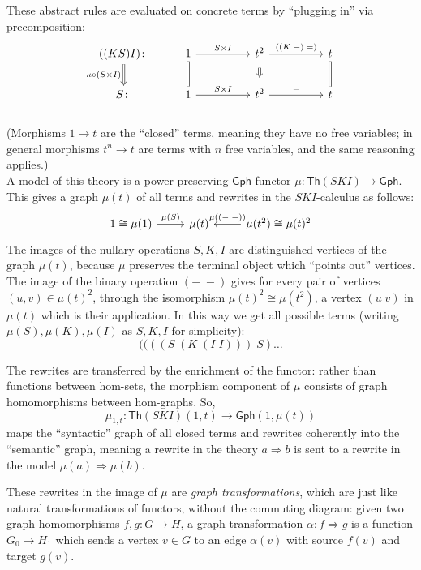 \documentclass{amsart}
\theoremstyle{definition}
\newcommand{\Th}{\mathsf{Th}}
\newcommand{\Gph}{\mathsf{Gph}}
\newcommand{\maps}{\colon}
\begin{document}
These abstract rules are evaluated on concrete terms by ``plugging in'' via precomposition:
\[\begin{tikzcd}
	((KS)I)\maps \arrow[Rightarrow,d,swap,"\kappa \circ (S\times I)"] & 1 \arrow[d,equal] \arrow[rr,"S\times I"] && t^2 \arrow[Rightarrow,d,shorten >=0.2cm,shorten <=0.2cm] \arrow[rr,"((K\; -)\; =)"] && t \arrow[d,equal]\\
	S\maps & 1 \arrow[rr,"S\times I"] && t^2 \arrow[rr,"-"] && t
\end{tikzcd}\]\\
(Morphisms $1\to t$ are the ``closed'' terms, meaning they have no free variables; in general morphisms $t^n\to t$ are terms with $n$ free variables, and the same reasoning applies.)\\

A model of this theory is a power-preserving $\Gph$-functor $\mu\maps \Th(SKI) \to \Gph$. This gives a graph $\mu(t)$ of all terms and rewrites in the $SKI$-calculus as follows:
\[\begin{tikzcd}
1 \cong \mu(1) \arrow[r,"\mu(S)"] & \mu(t) & \mu(t^2) \arrow[l,swap,"\mu(\left(-\;-\right))"] \cong \mu(t)^2
\end{tikzcd}\]
The images of the nullary operations $S,K,I$ are distinguished vertices of the graph $\mu(t)$, because $\mu$ preserves the terminal object which ``points out'' vertices. The image of the binary operation $(-\; -)$ gives for every pair of vertices $(u,v) \in \mu(t)^2$, through the isomorphism $\mu(t)^2 \cong \mu(t^2)$, a vertex $(u\; v)$ in $\mu(t)$ which is their application. In this way we get all possible terms (writing $\mu(S),\mu(K),\mu(I)$ as $S,K,I$ for simplicity): 
\[  ((((S\; (K\; (I\; I)))\; S) \dots \]

The rewrites are transferred by the enrichment of the functor: rather than functions between hom-sets, the morphism component of $\mu$ consists of graph homomorphisms between hom-graphs. So, $$\mu_{1,t}\maps \Th(SKI)(1,t)\to \Gph(1,\mu(t))$$ maps the ``syntactic'' graph of all closed terms and rewrites coherently into the ``semantic'' graph, meaning a rewrite in the theory $a\Rightarrow b$ is sent to a rewrite in the model $\mu(a) \Rightarrow \mu(b)$.

These rewrites in the image of $\mu$ are \textit{graph transformations}, which are just like natural transformations of functors, without the commuting diagram: given two graph homomorphisms $f,g\maps G\to H$, a graph transformation $\alpha\maps f \Rightarrow g$ is a function $G_0\to H_1$ which sends a vertex $v\in G$ to an edge $\alpha(v)$ with source $f(v)$ and target $g(v)$.
\end{document}

